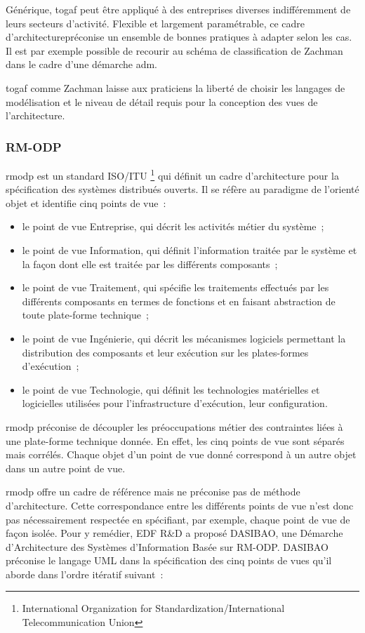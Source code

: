 Générique, \gls{togaf} peut être appliqué à des entreprises diverses
indifféremment de leurs secteurs d'activité. Flexible et largement paramétrable, ce cadre d'architecturepréconise un ensemble de bonnes pratiques à adapter selon les cas. Il est par exemple possible de recourir au schéma de classification de Zachman dans le
cadre d'une démarche \gls{adm}.

\gls{togaf} comme Zachman laisse aux praticiens la liberté de choisir les langages de
modélisation et le niveau de détail requis pour la conception des vues de
l'architecture. 

\subsubsection{RM-ODP}
\gls{rmodp} est un standard ISO/ITU \footnote{International Organization for Standardization/International Telecommunication Union} qui définit un cadre d'architecture pour la spécification des systèmes distribués ouverts.
Il se réfère au paradigme de l'orienté objet et identifie cinq points de vue~:
\begin{itemize}
\item le point de vue Entreprise, qui décrit les activités métier du système~;
\item le point de vue Information, qui définit l'information traitée par le système et la
façon dont elle est traitée par les différents composants~;
\item le point de vue Traitement, qui spécifie les traitements effectués
par les différents composants en termes de fonctions et en faisant abstraction de toute plate-forme technique~;
\item le point de vue Ingénierie, qui décrit les mécanismes logiciels permettant la
distribution des composants et leur exécution sur les plates-formes d'exécution~;
\item le point de vue Technologie, qui définit les technologies matérielles et logicielles
utilisées pour l’infrastructure d’exécution, leur configuration.
\end{itemize}

\gls{rmodp} préconise de découpler les préoccupations métier des
contraintes liées à une plate-forme technique donnée. En effet, les cinq points de vue sont séparés mais corrélés. Chaque objet d'un point de vue donné correspond à un autre objet dans un autre point de vue.

\gls{rmodp} offre un cadre de référence mais ne préconise pas de méthode d'architecture. Cette correspondance entre les différents points de vue n'est donc pas nécessairement respectée en spécifiant, par exemple, chaque point de vue de façon isolée.
Pour y remédier, EDF R\&D a proposé DASIBAO, une Démarche d’Architecture des
Systèmes d’Information Basée sur RM-ODP. DASIBAO préconise le langage UML dans la
spécification des cinq points de vues qu'il aborde dans l'ordre itératif suivant~:

